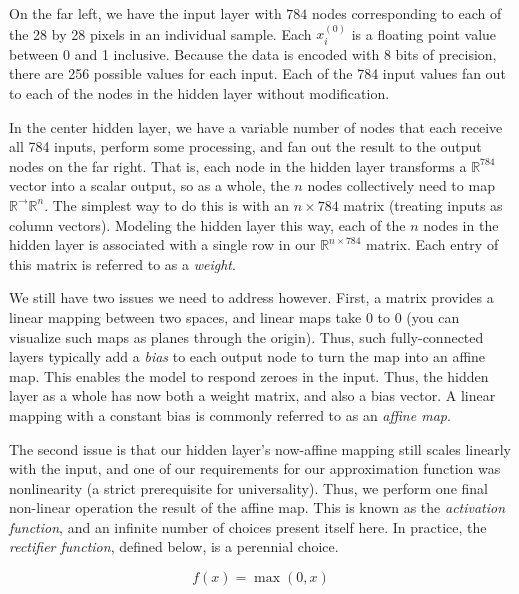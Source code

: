 \documentclass[
]{article}
\begin{document}
On the far left, we have the input layer with \(784\) nodes
corresponding to each of the 28 by 28 pixels in an individual sample.
Each \(x_i^{(0)}\) is a floating point value between 0 and 1 inclusive.
Because the data is encoded with 8 bits of precision, there are 256
possible values for each input. Each of the 784 input values fan out to
each of the nodes in the hidden layer without modification.

In the center hidden layer, we have a variable number of nodes that each
receive all 784 inputs, perform some processing, and fan out the result
to the output nodes on the far right. That is, each node in the hidden
layer transforms a \(\mathbb{R}^{784}\) vector into a scalar output, so
as a whole, the \(n\) nodes collectively need to map
\(\mathbb{R}^\rightarrow \mathbb{R}^n\). The simplest way to do this is
with an \(n\times 784\) matrix (treating inputs as column vectors).
Modeling the hidden layer this way, each of the \(n\) nodes in the
hidden layer is associated with a single row in our
\(\mathbb{R}^{n\times 784}\) matrix. Each entry of this matrix is
referred to as a \emph{weight}.

We still have two issues we need to address however. First, a matrix
provides a linear mapping between two spaces, and linear maps take \(0\)
to \(0\) (you can visualize such maps as planes through the origin).
Thus, such fully-connected layers typically add a \emph{bias} to each
output node to turn the map into an affine map. This enables the model
to respond zeroes in the input. Thus, the hidden layer as a whole has
now both a weight matrix, and also a bias vector. A linear mapping with
a constant bias is commonly referred to as an \emph{affine map}.

The second issue is that our hidden layer's now-affine mapping still
scales linearly with the input, and one of our requirements for our
approximation function was nonlinearity (a strict prerequisite for
universality). Thus, we perform one final non-linear operation the
result of the affine map. This is known as the \emph{activation
function}, and an infinite number of choices present itself here. In
practice, the \emph{rectifier function}, defined below, is a perennial
choice.

\[f(x) = \max(0, x)\]
\end{document}
